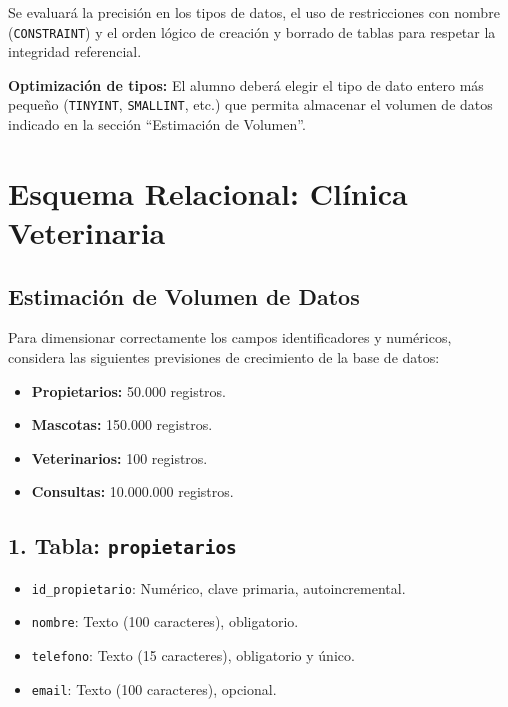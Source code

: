 \documentclass[a4paper,11pt]{article}
\begin{document}
\begin{Form}
\begin{tcolorbox}[colback=red!5!white,colframe=red!75!black,title=\textbf{IMPORTANTE}]
Se evaluará la precisión en los tipos de datos, el uso de restricciones con nombre (\texttt{CONSTRAINT}) y el orden lógico de creación y borrado de tablas para respetar la integridad referencial.

\textbf{Optimización de tipos:} El alumno deberá elegir el tipo de dato entero más pequeño (\texttt{TINYINT}, \texttt{SMALLINT}, etc.) que permita almacenar el volumen de datos indicado en la sección \enquote{Estimación de Volumen}.
\end{tcolorbox}

\section{Esquema Relacional: Clínica Veterinaria}

\subsection*{Estimación de Volumen de Datos}
Para dimensionar correctamente los campos identificadores y numéricos, considera las siguientes previsiones de crecimiento de la base de datos:
\begin{itemize}
    \item \textbf{Propietarios:} 50.000 registros.
    \item \textbf{Mascotas:} 150.000 registros.
    \item \textbf{Veterinarios:} 100 registros.
    \item \textbf{Consultas:} 10.000.000 registros.
\end{itemize}

\subsection*{1. Tabla: \texttt{propietarios} }
\begin{itemize}
    \item \texttt{id\_propietario}: Numérico, clave primaria, autoincremental.
    \item \texttt{nombre}: Texto (100 caracteres), obligatorio.
    \item \texttt{telefono}: Texto (15 caracteres), obligatorio y único.
    \item \texttt{email}: Texto (100 caracteres), opcional.
\end{itemize}


\end{Form}
\end{document}
